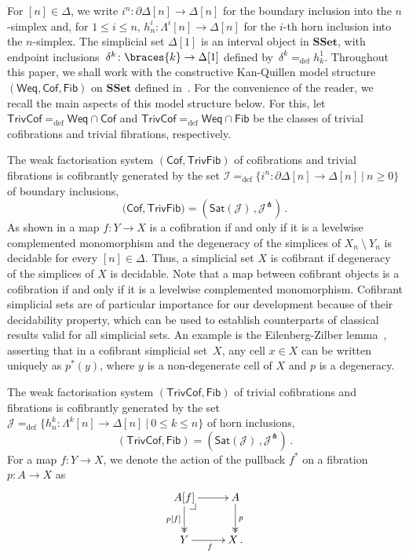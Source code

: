 \documentclass[reqno,10pt,a4paper,oneside]{amsart}
\makeatletter
\numberwithin{equation}{section}
\theoremstyle{mythm}
\theoremstyle{mydef}
\theoremstyle{myrmk}
\newcommand{\pullback}[1]{\save*!/#1-1.2pc/#1:(-1,1)@^{|-}\restore}
\newcommand{\drpullback}{\pullback{dr}}
\newcommand{\ie}{\text{i.e.\ }}
\newcommand{\defeq}{=_{\operatorname{def}}}
\newcommand{\co}{\colon}
\newcommand{\SSet}{\mathbf{SSet}}
\newcommand{\Weq}{\mathsf{Weq}}
\DeclarePairedDelimiter\braces\lbrace\rbrace
\newcommand{\cal}[1]{\mathcal{#1}}
\newcommand{\Cof}{\mathsf{Cof}}
\newcommand{\TrivFib}{\mathsf{TrivFib}}
\newcommand{\Fib}{\mathsf{Fib}}
\newcommand{\TrivCof}{\mathsf{TrivCof}}
\newcommand{\kcyl}{\delta^k}
\makeatother
\begin{document}
For $[n] \in \Delta$, we write $i^n \co  \partial \Delta[n] \to \Delta[n]$ for the boundary inclusion into the $n$-simplex and, for $1 \leq i \leq n$,  
$h^i_n  \co \Lambda^i[n] \to \Delta[n]$  for the $i$-th horn inclusion into the $n$-simplex. The simplicial set $\Delta[1]$ is an interval object in $\SSet$, with endpoint inclusions~$\kcyl \co \braces{ k} \to \Delta[1]$ defined by~$\kcyl \defeq h^1_k$. Throughout this paper, we shall work  with the constructive 
Kan-Quillen model structure $(\Weq, \Cof, \Fib)$ on $\SSet$ defined in~\cite{henry2019qms}. 
For the convenience of the reader, we recall the main aspects of this model structure below.
For this, let $\TrivCof \defeq \Weq \cap \Cof$ and $\TrivCof \defeq \Weq \cap \Fib$ be the classes of trivial cofibrations and trivial fibrations,
respectively. 

The weak factorisation system $(\Cof, \TrivFib)$ of cofibrations and trivial fibrations  is cofibrantly generated by the set $\cal{I} \defeq \{ i^n \co  \partial \Delta[n] \to \Delta[n] \ | \ n \geq 0 \}$  of boundary 
inclusions, \ie 
\[
\big( \Cof, \TrivFib \big) = ( \mathsf{Sat}(\cal{J}) \, , \cal{J}^\pitchfork) \, .
\]
As shown in \cite[Proposition~5.1.4]{henry2018wms} a map $f \co Y \to X$ is a cofibration if  and only if 
it is a levelwise complemented monomorphism and the degeneracy of the simplices of $X_n ~\setminus~Y_n$ is decidable for every $[n] \in \Delta$. Thus, a simplicial set $X$ is
cofibrant if  degeneracy of the simplices of $X$ is decidable.
Note that a map between cofibrant objects is a cofibration
if and only if it is a levelwise complemented monomorphism. 
Cofibrant simplicial sets are of particular importance for our development because of their decidability property, which can be used to establish counterparts of classical results valid for all simplicial sets. An example is the Eilenberg-Zilber lemma~\cite[Lemma~5.1.2]{henry2018wms}, asserting that in a cofibrant simplicial set~$X$, any cell $x \in X$ can be written uniquely as $p^*(y)$, where $y$ is a non-degenerate cell of $X$ and $p$ is a degeneracy. 
\medskip

The weak factorisation system $(\TrivCof, \Fib)$ of  trivial cofibrations and fibrations is cofibrantly 
generated by the set $\cal{J} \defeq \{ h^k_n  \co \Lambda^k[n] \to \Delta[n]  \ | \ 0 \leq k \leq n \}$ of horn 
inclusions, \ie 
\[
(\TrivCof, \Fib) = ( \mathsf{Sat}(\cal{J}) \, , \cal{J}^\pitchfork) \, .
\] 
For a map $f \co Y \to X$, we denote the action of the pullback $f^*$ on a fibration~$p \co A \to X$ as
\[
\xymatrix{
A[f] \ar[r] \drpullback \ar@{->>}[d]_{p[f]} & A \ar@{->>}[d]^{p} \\
Y \ar[r]_f & X \, .}
\]
\end{document}
